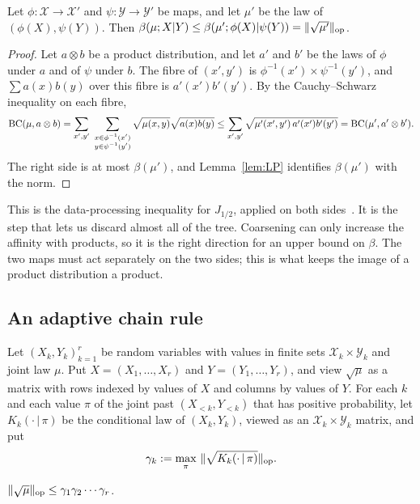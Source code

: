 \begin{lemma}\label{lem:dpi}
Let $\phi:\mathcal X\to\mathcal X'$ and $\psi:\mathcal Y\to\mathcal Y'$ be maps, and let $\mu'$ be the law of $(\phi(X),\psi(Y))$. Then $\beta(\mu;X|Y)\le\beta(\mu';\phi(X)|\psi(Y))=\lVert \sqrt{\mu'}\rVert_{\mathrm{op}}$.
\end{lemma}

\begin{proof}
Let $a\otimes b$ be a product distribution, and let $a'$ and $b'$ be the laws of $\phi$ under $a$ and of $\psi$ under $b$. The fibre of $(x',y')$ is $\phi^{-1}(x')\times\psi^{-1}(y')$, and $\sum a(x)b(y)$ over this fibre is $a'(x')b'(y')$. By the Cauchy--Schwarz inequality on each fibre,
\[
  \BC(\mu,a\otimes b)=\sum_{x',y'}\ \sum_{\substack{x\in\phi^{-1}(x')\\ y\in\psi^{-1}(y')}}\sqrt{\mu(x,y)}\sqrt{a(x)b(y)}
  \le\sum_{x',y'}\sqrt{\mu'(x',y')\,a'(x')b'(y')}=\BC(\mu',a'\otimes b').
\]
The right side is at most $\beta(\mu')$, and Lemma~\ref{lem:LP} identifies $\beta(\mu')$ with the norm.
\end{proof}

This is the data-processing inequality for $J_{1/2}$, applied on both sides~\cite[Lemma~4]{LapidothPfister19}. It is the step that lets us discard almost all of the tree. Coarsening can only increase the affinity with products, so it is the right direction for an upper bound on $\beta$. The two maps must act separately on the two sides; this is what keeps the image of a product distribution a product.

\subsection{An adaptive chain rule}

Let $(X_k,Y_k)_{k=1}^r$ be random variables with values in finite sets $\mathcal X_k\times\mathcal Y_k$ and joint law $\mu$. Put $X=(X_1,\dots,X_r)$ and $Y=(Y_1,\dots,Y_r)$, and view $\sqrt\mu$ as a matrix with rows indexed by values of $X$ and columns by values of $Y$. For each $k$ and each value $\pi$ of the joint past $(X_{<k},Y_{<k})$ that has positive probability, let $K_k(\cdot\,|\,\pi)$ be the conditional law of $(X_k,Y_k)$, viewed as an $\mathcal X_k\times\mathcal Y_k$ matrix, and put
\[
  \gamma_k:=\max_\pi\ \opnorm{\sqrt{K_k(\cdot\,|\,\pi)}} .
\]

\begin{lemma}\label{lem:chain}
$\lVert \sqrt\mu\rVert_{\mathrm{op}}\le\gamma_1\gamma_2\cdots\gamma_r$.
\end{lemma}

